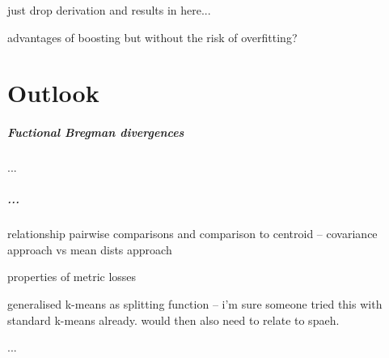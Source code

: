 \documentclass[
    a4paper, %
	fontsize=10pt, %
	twoside=false, %
]{kaobook}
\begin{document}
just drop derivation and results in here...

advantages of boosting but without the risk of overfitting?

\chapter{Outlook}

\paragraph{Fuctional Bregman divergences} ...

\paragraph{...}

relationship pairwise comparisons and comparison to centroid -- covariance approach vs mean dists approach

properties of metric losses

generalised k-means as splitting function -- i'm sure someone tried this with standard k-means already. would then also need to relate to spaeh.

...


\backmatter %



\printbibliography[heading=bibintoc, title=Bibliography, prenote=bibnote] %



\printindex %
\end{document}
